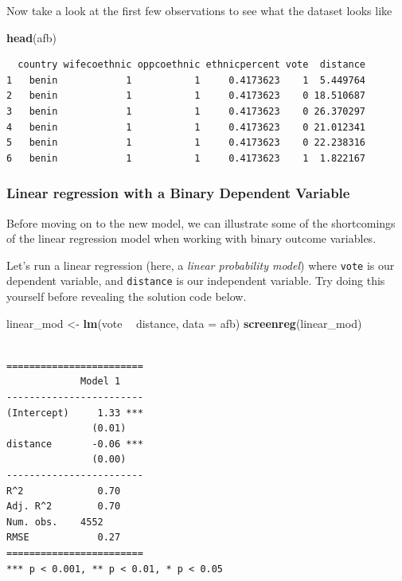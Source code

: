 \documentclass[]{article}
\newenvironment{Shaded}{\begin{snugshade}}{\end{snugshade}}
\newcommand{\KeywordTok}[1]{\textcolor[rgb]{0.13,0.29,0.53}{\textbf{#1}}}
\newcommand{\DataTypeTok}[1]{\textcolor[rgb]{0.13,0.29,0.53}{#1}}
\newcommand{\StringTok}[1]{\textcolor[rgb]{0.31,0.60,0.02}{#1}}
\newcommand{\OperatorTok}[1]{\textcolor[rgb]{0.81,0.36,0.00}{\textbf{#1}}}
\newcommand{\NormalTok}[1]{#1}
\theoremstyle{definition}
\theoremstyle{definition}
\theoremstyle{definition}
\theoremstyle{remark}
\begin{document}
Now take a look at the first few observations to see what the dataset
looks like

\begin{Shaded}
\begin{Highlighting}[]
\KeywordTok{head}\NormalTok{(afb)}
\end{Highlighting}
\end{Shaded}

\begin{verbatim}
  country wifecoethnic oppcoethnic ethnicpercent vote  distance
1   benin            1           1     0.4173623    1  5.449764
2   benin            1           1     0.4173623    0 18.510687
3   benin            1           1     0.4173623    0 26.370297
4   benin            1           1     0.4173623    0 21.012341
5   benin            1           1     0.4173623    0 22.238316
6   benin            1           1     0.4173623    1  1.822167
\end{verbatim}

\subsubsection{Linear regression with a Binary Dependent
Variable}\label{linear-regression-with-a-binary-dependent-variable}

Before moving on to the new model, we can illustrate some of the
shortcomings of the linear regression model when working with binary
outcome variables.

Let's run a linear regression (here, a \emph{linear probability model})
where \texttt{vote} is our dependent variable, and \texttt{distance} is
our independent variable. Try doing this yourself before revealing the
solution code below.

\begin{Shaded}
\begin{Highlighting}[]
\NormalTok{linear_mod <-}\StringTok{ }\KeywordTok{lm}\NormalTok{(vote }\OperatorTok{~}\StringTok{ }\NormalTok{distance, }\DataTypeTok{data =}\NormalTok{ afb)}
\KeywordTok{screenreg}\NormalTok{(linear_mod)}
\end{Highlighting}
\end{Shaded}

\begin{verbatim}

========================
             Model 1    
------------------------
(Intercept)     1.33 ***
               (0.01)   
distance       -0.06 ***
               (0.00)   
------------------------
R^2             0.70    
Adj. R^2        0.70    
Num. obs.    4552       
RMSE            0.27    
========================
*** p < 0.001, ** p < 0.01, * p < 0.05
\end{verbatim}
\end{document}
